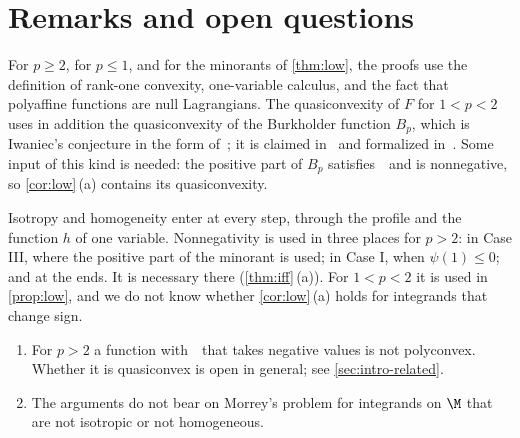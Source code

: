\section{Remarks and open questions}\label{sec:discussion}

\begin{remark}
For $p\ge2$, for $p\le1$, and for the minorants of \cref{thm:low}, the proofs use the
definition of rank-one convexity, one-variable calculus, and the fact that polyaffine functions
are null Lagrangians. The quasiconvexity of $F$ for $1<p<2$ uses in addition the quasiconvexity
of the Burkholder function $B_p$, which is Iwaniec's conjecture in the form
of~\cite[Conjecture~1.1]{GuerraKristensen2022}; it is claimed in~\cite[Corollary~2]{SharpHI}
and formalized in~\cite{IwaniecLean}. Some input of this kind is needed: the
positive part of $B_p$ satisfies~\Hyp\ and is nonnegative, so \cref{cor:low}\,(a) contains its
quasiconvexity.
\end{remark}

\begin{remark}
Isotropy and homogeneity enter at every step, through the profile and the function $h$ of one
variable. Nonnegativity is used in three places for $p>2$: in Case III, where the positive part
of the minorant is used; in Case I, when $\psi(1)\le0$; and at the ends. It is necessary there
(\cref{thm:iff}\,(a)). For $1<p<2$ it is used in \cref{prop:low}, and we do not know whether
\cref{cor:low}\,(a) holds for integrands that change sign.
\end{remark}

\begin{remark}
\begin{enumerate}[label=\textup{(\roman*)}]
\item For $p>2$ a function with~\Hyp\ that takes negative values is not polyconvex. Whether it
  is quasiconvex is open in general; see \cref{sec:intro-related}.
\item The arguments do not bear on Morrey's problem for integrands on $\M$ that are not
  isotropic or not homogeneous.
\end{enumerate}
\end{remark}
